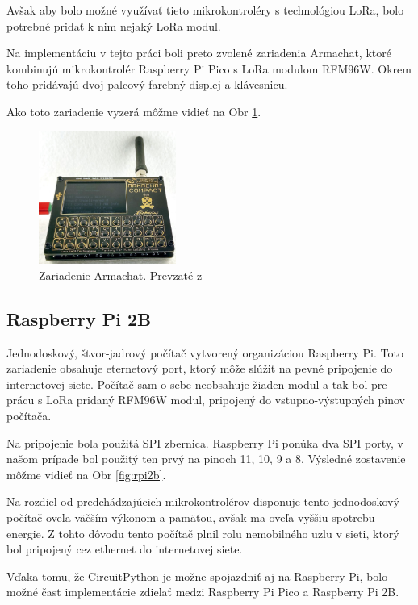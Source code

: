 \documentclass[slovak,master]{diploma}
\begin{document}
Avšak aby bolo možné využívať tieto mikrokontroléry s technológiou LoRa, bolo potrebné pridať k nim nejaký LoRa modul.

Na implementáciu v tejto práci boli preto zvolené zariadenia Armachat, ktoré kombinujú mikrokontrolér Raspberry Pi Pico s LoRa modulom RFM96W.
Okrem toho pridávajú dvoj palcový farebný displej a klávesnicu.

Ako toto zariadenie vyzerá môžme vidieť na Obr \ref{fig:armachat}.

\begin{figure}[h!]
	\centering
	\includegraphics[width=0.4\textwidth]{Figures/armachat.jpg}
	\caption{Zariadenie Armachat. Prevzaté z \cite{armachatObr}}
	\label{fig:armachat}
\end{figure}
\newpage

\subsection{Raspberry Pi 2B}
Jednodoskový, štvor-jadrový počítač vytvorený organizáciou Raspberry Pi. 
Toto zariadenie obsahuje eternetový port, ktorý môže slúžiť na pevné pripojenie do internetovej siete.
Počítač sam o sebe neobsahuje žiaden modul a tak bol pre prácu s LoRa pridaný RFM96W modul, pripojený do vstupno-výstupných pinov počítača.

Na pripojenie bola použitá SPI zbernica. Raspberry Pi ponúka dva SPI porty, v našom prípade bol použitý ten prvý na pinoch 11, 10, 9 a 8. 
Výsledné zostavenie môžme vidieť na Obr \ref{fig:rpi2b}.

Na rozdiel od predchádzajúcich mikrokontrolérov disponuje tento jednodoskový počítač oveľa väčším výkonom a pamäťou, 
avšak ma oveľa vyššiu spotrebu energie. Z tohto dôvodu tento počítač plnil rolu nemobilného uzlu v sieti, ktorý bol pripojený cez ethernet do internetovej siete.

Vďaka tomu, že CircuitPython je možne spojazdniť aj na Raspberry Pi, bolo možné čast implementácie zdielať medzi Raspberry Pi Pico a Raspberry Pi 2B.
\end{document}

